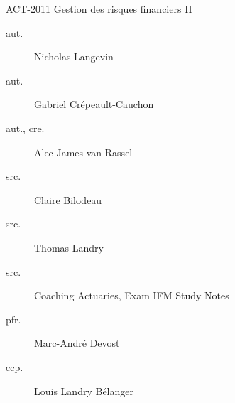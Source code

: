 \begin{contrib}{ACT-2011\: Gestion des risques financiers II}
\begin{description}
	\item[aut.] Nicholas Langevin
	\item[aut.] Gabriel Crépeault-Cauchon 
	\item[aut., cre.] Alec James van Rassel
	\item[src.] Claire Bilodeau
	\item[src.] Thomas Landry	
	\item[src.]	Coaching Actuaries, Exam IFM Study Notes
	\item[pfr.]	Marc-André Devost
	\item[ccp.]	Louis Landry Bélanger
\end{description}
\end{contrib}
